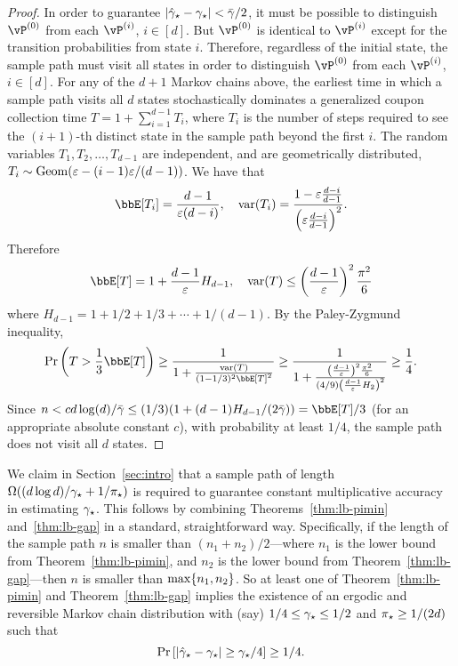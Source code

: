 \begin{proof}
  In order to guarantee $|\hat\gamma_{\star} - \gamma_{\star}| < \bar\gamma/2$, it must
  be possible to distinguish $\vP^{(0)}$ from each $\vP^{(i)}$,
  $i\in[d]$.
  But $\vP^{(0)}$ is identical to $\vP^{(i)}$ except for the transition
  probabilities from state $i$.
  Therefore, regardless of the initial state, the sample path must
  visit all states in order to distinguish $\vP^{(0)}$ from each
  $\vP^{(i)}$, $i \in [d]$.
  For any of the $d+1$ Markov chains above, the earliest time in which
  a sample path visits all $d$ states
  stochastically dominates a generalized coupon collection time $T = 1 +
  \sum_{i=1}^{d-1} T_i$, where $T_i$ is the number of steps required to
  see the $(i+1)$-th distinct state in the sample path beyond the first
  $i$.
  The random variables $T_1,T_2,\dotsc,T_{d-1}$ are independent, and are
  geometrically distributed, $T_i \sim \operatorname{Geom}(\varepsilon -
  (i-1)\varepsilon/(d-1))$.
  We have that
  \[
    \bbE[T_i] = \frac{d-1}{\veps(d-i)} , \quad
    \var(T_i) = \frac{1 - \veps \frac{d-i}{d-1}}{%
      \Parens{ \veps \frac{d-i}{d-1} }^2
    }
    .
  \]
  Therefore
  \[
    \bbE[T] = 1 + \frac{d-1}{\veps} H_{d-1} , \quad
    \var(T) \leq \Parens{ \frac{d-1}{\veps} }^2 \frac{\pi^2}{6} 
  \]
  where $H_{d-1} = 1 + 1/2 + 1/3 + \dotsb + 1/(d-1)$.
  By the Paley-Zygmund inequality,
  \[
    \Pr\Parens{ T > \frac13\bbE[T] }
    \geq \frac{1}{1 + \frac{\var(T)}{(1-1/3)^2\bbE[T]^2}}
    \geq \frac{1}{1 + \frac{\Parens{ \frac{d-1}{\veps} }^2
    \frac{\pi^2}{6}}{(4/9)\Parens{ \frac{d-1}{\veps} H_2}^2}}
    \geq \frac14
    .
  \]
  Since $n < c d\log(d) / \bar\gamma \leq (1/3) (1 + (d-1) H_{d-1} /
  (2\bar\gamma)) = \bbE[T]/3$ (for an appropriate absolute constant
  $c$), with probability at least $1/4$, the sample path does not
  visit all $d$ states.
\end{proof}

We claim in Section~\ref{sec:intro} that a sample path of length
$\Omega( (d \log d)/\gamma_{\star} + 1/\pi_{\star})$ is required to guarantee
constant multiplicative accuracy in estimating $\gamma_{\star}$.
This follows by combining Theorems~\ref{thm:lb-pimin}
and~\ref{thm:lb-gap} in a standard, straightforward way.
Specifically, if the length of the sample path $n$ is smaller than
$(n_1 + n_2) / 2$---where $n_1$ is the lower bound from
Theorem~\ref{thm:lb-pimin}, and $n_2$ is the lower bound from
Theorem~\ref{thm:lb-gap}---then $n$ is smaller than
$\max\{n_1,n_2\}$.
So at least one of Theorem~\ref{thm:lb-pimin} and
Theorem~\ref{thm:lb-gap} implies the existence of an ergodic and
reversible Markov chain distribution with (say) $1/4 \leq \gamma_{\star} \leq
1/2$ and $\pi_{\star} \geq 1/(2d)$ such that
\[
  \Pr\left[ |\hat\gamma_{\star} - \gamma_{\star}| \geq \gamma_{\star}/4 \right] \geq 1/4
  .
\]



